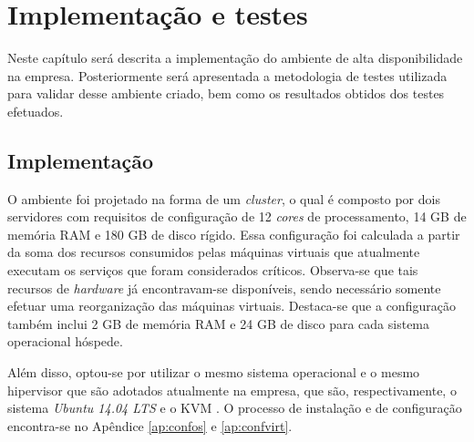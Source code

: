 \chapter{Implementação e testes}
\label{cap:implementacaoresultados}

Neste capítulo será descrita a implementação do ambiente de alta disponibilidade na empresa. Posteriormente será
apresentada a metodologia de testes utilizada para validar desse ambiente criado, bem como os resultados obtidos dos testes efetuados.

\section{Implementação}
\label{section:implementacao}


O ambiente foi projetado na forma de um \textit{cluster}, o qual é composto por dois servidores com requisitos de configuração 
de 12 \textit{cores} de processamento, 14 GB de memória \ac{RAM} e 180 GB de disco rígido.
Essa configuração foi calculada a partir da soma dos recursos consumidos pelas máquinas virtuais que atualmente executam os serviços que foram 
considerados críticos. Observa-se que tais recursos de \textit{hardware} já encontravam-se disponíveis, sendo necessário somente efetuar uma 
reorganização das máquinas virtuais. Destaca-se que a configuração também inclui 2 GB de memória \ac{RAM} e 24 GB de disco para cada sistema 
operacional hóspede.

Além disso, optou-se por utilizar o mesmo sistema operacional e o mesmo hipervisor que são adotados atualmente na empresa, que são, 
respectivamente, o sistema \textit{Ubuntu 14.04 \ac{LTS}} e o \ac{KVM} \cite{kvm}. O processo de instalação e de configuração encontra-se no 
Apêndice \ref{ap:confos} e \ref{ap:confvirt}.

